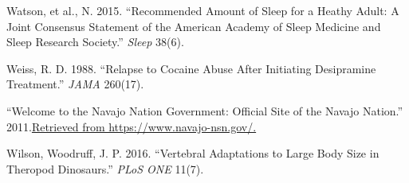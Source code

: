 \documentclass[
]{report}
\newlength{\cslhangindent}
\newenvironment{CSLReferences}[2] %
 {\begin{list}{}{%
  \setlength{\itemindent}{0pt}
  \setlength{\leftmargin}{0pt}
  \setlength{\parsep}{0pt}
  \ifodd #1
   \setlength{\leftmargin}{\cslhangindent}
   \setlength{\itemindent}{-1\cslhangindent}
  \fi
  \setlength{\itemsep}{#2\baselineskip}}}
 {\end{list}}
\begin{document}
\begin{CSLReferences}{1}{0}
Watson, et al., N. 2015. {``Recommended Amount of Sleep for a Heathy Adult: A Joint Consensus Statement of the American Academy of Sleep Medicine and Sleep Research Society.''} \emph{Sleep} 38(6).

Weiss, R. D. 1988. {``Relapse to Cocaine Abuse After Initiating Desipramine Treatment.''} \emph{JAMA} 260(17).

{``Welcome to the Navajo Nation Government: Official Site of the Navajo Nation.''} 2011.\href{\%20Retrieved\%20from\%20https://www.navajo-nsn.gov/.}{Retrieved from https://www.navajo-nsn.gov/.}

Wilson, Woodruff, J. P. 2016. {``Vertebral Adaptations to Large Body Size in Theropod Dinosaurs.''} \emph{PLoS ONE} 11(7).

\end{CSLReferences}
\end{document}
